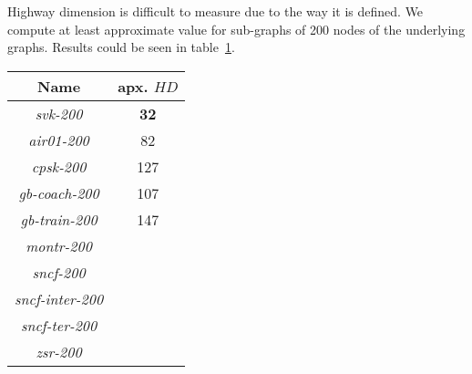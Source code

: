 	\noindent Highway dimension is difficult to measure due to the way it is defined. We compute at least approximate value for sub-graphs of 200 nodes of the underlying graphs. Results could be seen in table~\ref{table:ug_hd}.
	
	\begin{table}[H]
		\centering
		\begin{tabular}{c|c}
			\rowcolor{tablehead}
			\textbf{Name} & apx. $HD$ \\
			\hline
			\textit{svk-200} & \textbf{32} \\
			\textit{air01-200} & 82 \\
			\textit{cpsk-200} & 127 \\
			\textit{gb-coach-200} & 107 \\
			\textit{gb-train-200} & 147 \\
			\textit{montr-200} &  \\
			\textit{sncf-200} &  \\
			\textit{sncf-inter-200} &  \\
			\textit{sncf-ter-200} &  \\
			\textit{zsr-200} &  \\
		\end{tabular}
		\label{table:ug_hd}
	\end{table}